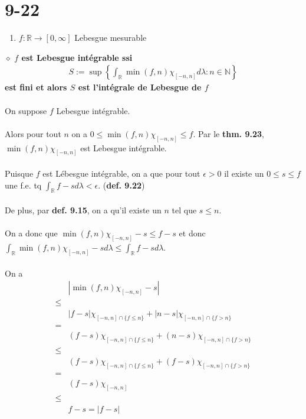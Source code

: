 \documentclass[a4paper,10pt]{article}
\begin{document}
\section*{9-22}
\begin{enumerate}
	\item $f : \mathbb{R} \rightarrow [0, \infty]$ Lebesgue mesurable
\end{enumerate}
$\diamond$ \textbf{$f$ est Lebesgue intégrable ssi}
\begin{align*}
	S := \sup \left \{ \int_\mathbb{R} \min (f,n) \chi_{[-n,n]}d\lambda : n \in \mathbb{N} \right\}
\end{align*}
\textbf{est fini et alors $S$ est l'intégrale de Lebesgue de $f$}
\\
\\
On suppose $f$ Lebesgue intégrable.
\\
\\
Alors pour tout $n$ on a $0 \leq \min (f,n) \chi_{[-n,n]} \leq f$. Par le \textbf{thm. 9.23}, $\min (f,n) \chi_{[-n,n]}$ est Lebesgue intégrable. 
\\
\\
Puisque $f$ est Lébesgue intégrable, on a que pour tout $\epsilon > 0$ il existe un $0 \leq s \leq f$ une f.e. tq $\int_{\mathbb{R}} f - s d \lambda < \epsilon$. (\textbf{def. 9.22}) 
\\
\\
De plus, par \textbf{def. 9.15}, on a qu'il existe un $n$ tel que $s \leq n$. 
\\
\\
On a donc que $\min (f,n) \chi_{[-n,n]} - s \leq f - s$ et donc $\int_\mathbb{R} \min (f,n) \chi_{[-n,n]} - s d\lambda \leq \int_\mathbb{R} f - s d\lambda$. 
\\
\\
On a 
\begin{align*}
	& |\min (f,n) \chi _{[-n,n]} - s| \\
	\leq \\
	& |f-s|\chi_{[-n,n] \cap \{f \leq n\}} + |n - s|\chi_{[-n,n] \cap \{f > n\}} \\
	= \\
	& (f-s)\chi_{[-n,n] \cap \{f \leq n\}} + (n - s)\chi_{[-n,n] \cap \{f > n\}} \\
	\leq \\
	& (f-s)\chi_{[-n,n] \cap \{f \leq n\}} + (f - s)\chi_{[-n,n] \cap \{f > n\}} \\
	= \\
	& (f-s) \chi_{[-n,n]} \\
	\leq \\
	& f-s = |f-s|
\end{align*}
\end{document}
